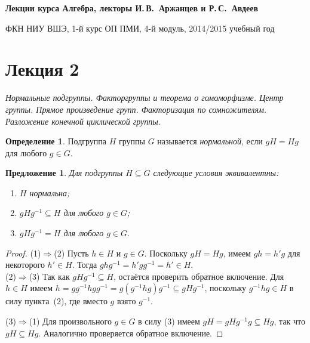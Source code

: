 \documentclass[a4paper,10pt]{amsart}
\newtheorem{proposition}{Предложение}
\theoremstyle{definition}
\newtheorem{definition}{Определение}
\theoremstyle{remark}
\begin{document}
%
\sloppy
%
\centerline{\large \bf Лекции курса \guillemotleft
Алгебра\guillemotright{}, лекторы И.\,В.~Аржанцев и Р.\,С.~Авдеев}

\smallskip

\centerline{\large ФКН НИУ ВШЭ, 1-й курс ОП ПМИ, 4-й модуль,
2014/2015 учебный год}


\bigskip

\section*{Лекция 2}

\medskip

{\it Нормальные подгруппы. Факторгруппы и теорема о гомоморфизме.
Центр группы. Прямое произведение групп. Факторизация по
сомножителям. Разложение конечной циклической группы.}

\medskip

\begin{definition}
Подгруппа $H$ группы $G$ называется {\it нормальной}, если $gH=Hg$
для любого $g\in G$.
\end{definition}

\begin{proposition}
Для подгруппы $H \subseteq G$ следующие условия эквивалентны:

\vspace{-2mm}
\begin{enumerate}
\item[(1)]
$H$ нормальна;

\item[(2)]
$gHg^{-1} \subseteq H$ для любого $g \in G$;

\item[(3)]
$gHg^{-1}=H$ для любого $g\in G$.
\end{enumerate}
\end{proposition}

\vspace{-6mm}

\begin{proof}
(1)$\Rightarrow$(2) Пусть $h \in H$ и $g \in G$. Поскольку $gH =
Hg$, имеем $gh = h'g$ для некоторого $h' \in H$. Тогда $ghg^{-1} =
h'gg^{-1} = h' \in H$.\\
(2)$\Rightarrow$(3) Так как $gHg^{-1} \subseteq H$, остаётся
проверить обратное включение. Для $h \in H$ имеем $h = gg^{-1} h g
g^{-1} = g(g^{-1}hg)g^{-1} \subseteq gHg^{-1}$, поскольку $g^{-1}hg
\in H$ в силу пункта~(2), где вместо $g$ взято $g^{-1}$.

(3)$\Rightarrow$(1) Для произвольного $g \in G$ в силу (3) имеем $gH
= gHg^{-1} g \subseteq Hg$, так что $gH \subseteq Hg$. Аналогично
проверяется обратное включение.
\end{proof}
\vspace{-1mm}
\end{document}
